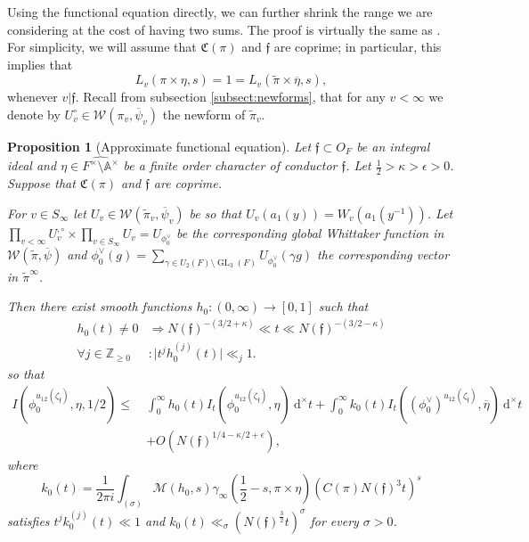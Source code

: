 \documentclass[a4paper,11pt]{amsart}
\newtheorem{proposition}[theorem]{Proposition}
\theoremstyle{definition}
\newcommand{\A}{\mathbb{A}}
\newcommand{\Z}{\mathbb{Z}}
\newcommand{\gelle}{\operatorname{GL}}
\begin{document}
Using the functional equation directly, we can further shrink the range we are considering at the cost of having two sums. The proof is virtually the same as \cite[Theorem 16]{MR4370537}.
For simplicity, we will assume that $\mathfrak{C}(\pi)$ and $\mathfrak{f}$ are coprime; in particular, this implies that $$L_v(\pi\times \eta,s) = 1 = L_v(\tilde{\pi}\times \overline{\eta},s),$$ whenever $v|\mathfrak{f}$. Recall from subsection \ref{subsect:newforms}, that for any $v< \infty$ we denote by $U_v^{\circ} \in \mathcal{W}(\pi_v,\overline{\psi}_v)$ the newform of $\tilde{\pi}_v$. 



\begin{proposition}[Approximate functional equation]\label{prop:approximatefunctionalequation}
Let $\mathfrak{f} \subset O_F$ be an integral ideal and $\eta \in \widehat{F^{\times}\setminus\A^{\times}}$ be a finite order character of conductor $\mathfrak{f}$.
Let $\frac{1}{2}>\kappa > \epsilon > 0$. Suppose that $\mathfrak{C}(\pi)$ and $\mathfrak{f}$ are coprime. 

For $v\in S_{\infty}$ let $U_v \in \mathcal{W}(\tilde{\pi}_v,\overline{\psi}_v)$ be so that $U_v(a_1(y))= W_v(a_1(y^{-1}))$. Let $\prod_{v<\infty}U^{,\circ}_v \times \prod_{v\in S_{\infty}}U_v = U_{\phi_0^{\vee}}$ be the corresponding global Whittaker function in $\mathcal{W}(\tilde{\pi},\overline{\psi})$ and $\phi_0^{\vee}(g) = \sum_{\gamma \in U_2(F)\setminus \gelle_3(F)}U_{\phi_0^{\vee}}(\gamma g)$ the corresponding vector in $\tilde{\pi}^{\infty}$. 

Then there exist smooth functions $h_0\colon (0,\infty)\to [0,1]$ such that 
\begin{align*}h_0(t) \neq 0 &\Rightarrow N(\mathfrak{f})^{-(3/2+\kappa)}\ll t\ll N(\mathfrak{f})^{-(3/2-\kappa)}\\
\forall j\in \Z_{\geq 0}&: \vert t^j h_0^{(j)}(t)\vert\ll_j 1. \end{align*} 
so that
\begin{align*}\label{eq:approximatefunctionalequation}
    I(\phi_0^{u_{12}(\zeta_\mathfrak f)},\eta,1/2) \leq \ & \int_{0}^{\infty}h_0(t)I_t(\phi_0^{u_{12}(\zeta_\mathfrak f)},\eta)\ \mathrm{d}^{\times}t+ \int_{0}^{\infty}k_0(t)I_t((\phi_0^{\vee})^{u_{12}(\zeta_\mathfrak f)},\overline{\eta})\ \mathrm{d}^{\times}t \\&+ O(N(\mathfrak{f})^{1/4-\kappa/2+\epsilon}),
\end{align*}
where \[k_0(t) = \frac{1}{2\pi i}\int_{(\sigma)}\mathcal M(h_0,s)\gamma_{\infty}\left(\frac{1}{2}-s,\pi \times \eta\right)(C(\pi)N(\mathfrak{f})^3t)^{s} \]
satisfies $t^jk_0^{(j)}(t) \ll 1$ and $k_0(t) \ll_{\sigma} (N(\mathfrak{f})^{\frac{3}{2}}t)^\sigma$ for every $\sigma >0$. 
\end{proposition}
\end{document}
